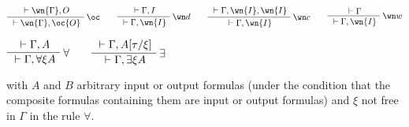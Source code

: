 \(\AxRule{{}\vdash\wn{\Gamma},O}
\LabelRule{\oc}
\UnaRule{{}\vdash\wn{\Gamma},\oc{O}}
\DisplayProof
\qquad
\AxRule{{}\vdash\Gamma,I}
\LabelRule{\wn d}
\UnaRule{{}\vdash\Gamma,\wn{I}}
\DisplayProof
\qquad
\AxRule{{}\vdash\Gamma,\wn{I},\wn{I}}
\LabelRule{\wn c}
\UnaRule{{}\vdash\Gamma,\wn{I}}
\DisplayProof
\qquad
\AxRule{{}\vdash\Gamma}
\LabelRule{\wn w}
\UnaRule{{}\vdash\Gamma,\wn{I}}
\DisplayProof\)

\(\AxRule{{}\vdash\Gamma,A}
\LabelRule{\forall}
\UnaRule{{}\vdash\Gamma,\forall\xi A}
\DisplayProof
\qquad
\AxRule{{}\vdash\Gamma,A[\tau/\xi]}
\LabelRule{\exists}
\UnaRule{{}\vdash\Gamma,\exists\xi A}
\DisplayProof\)

with \(A\) and \(B\) arbitrary input or output formulas (under the
condition that the composite formulas containing them are input or
output formulas) and \(\xi\) not free in \(\Gamma\) in the rule
\(\forall\).


